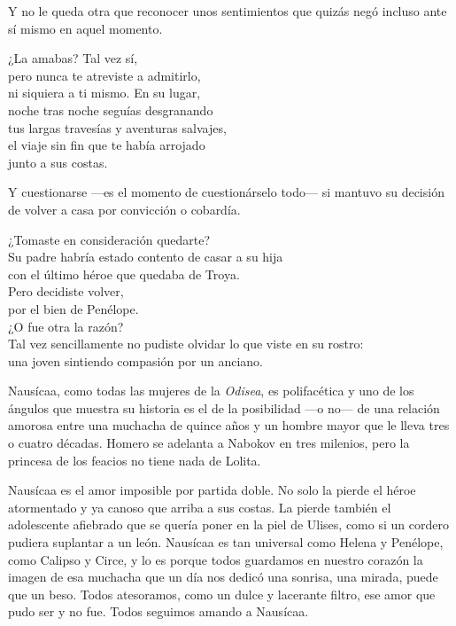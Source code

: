 Y no le queda otra que reconocer unos sentimientos que quizás negó incluso ante sí mismo en aquel momento.

\begin{versopropio}
¿La amabas? Tal vez sí,\\
pero nunca te atreviste a admitirlo,\\
ni siquiera a ti mismo. En su lugar,\\
noche tras noche seguías desgranando\\
tus largas travesías y aventuras salvajes,\\
el viaje sin fin que te había arrojado\\
junto a sus costas.
\end{versopropio}

Y cuestionarse ---es el momento de cuestionárselo todo--- si mantuvo su decisión de volver a casa por convicción o cobardía.

\begin{versopropio}
¿Tomaste en consideración quedarte?\\
Su padre habría estado contento de casar a su hija\\
con el último héroe que quedaba de Troya.\\
Pero decidiste volver,\\
por el bien de Penélope.\\
¿O fue otra la razón?\\
Tal vez sencillamente no pudiste olvidar lo que viste en su rostro:\\
una joven sintiendo compasión por un anciano.
\end{versopropio}

Nausícaa, como todas las mujeres de la \emph{Odisea}, es polifacética y uno de los ángulos que muestra su historia es el de la posibilidad ---o no--- de una relación amorosa entre una muchacha de quince años y un hombre mayor que le lleva tres o cuatro décadas. Homero se adelanta a Nabokov en tres milenios, pero la princesa de los feacios no tiene nada de Lolita.

Nausícaa es el amor imposible por partida doble. No solo la pierde el héroe atormentado y ya canoso que arriba a sus costas. La pierde también el adolescente afiebrado que se quería poner en la piel de Ulises, como si un cordero pudiera suplantar a un león. Nausícaa es tan universal como Helena y Penélope, como Calipso y Circe, y lo es porque todos guardamos en nuestro corazón la imagen de esa muchacha que un día nos dedicó una sonrisa, una mirada, puede que un beso. Todos atesoramos, como un dulce y lacerante filtro, ese amor que pudo ser y no fue. Todos seguimos amando a Nausícaa.
